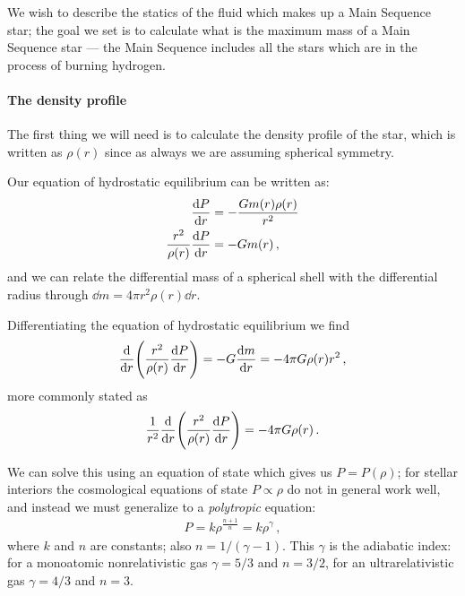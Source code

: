 \documentclass[main.tex]{subfiles}
\begin{document}
We wish to describe the statics of the fluid which makes up a Main Sequence star; the goal we set is to calculate what is the maximum mass of a Main Sequence star --- the Main Sequence includes all the stars which are in the process of burning hydrogen. 

\paragraph{The density profile}

The first thing we will need is to calculate the density profile of the star, which is written as \(\rho (r)\) since as always we are assuming spherical symmetry. 

Our equation of hydrostatic equilibrium can be written as:
%
\begin{align}
  \dv{P}{r} &= - \frac{G m(r) \rho (r)}{r^2}  \\
  \frac{r^2}{\rho (r)} \dv{P}{r} &= - G m(r)
\,,
\end{align}
%
and we can relate the differential mass of a spherical shell with the differential radius through \(\dd{m} = 4 \pi r^2 \rho (r) \dd{r}\).

Differentiating the equation of hydrostatic equilibrium we find
%
\begin{align}
  \dv{}{r} \qty(\frac{r^2}{\rho (r)} \dv{P}{r}) = - G \dv{m}{r} = - 4 \pi G \rho (r) r^2
\,,
\end{align}
%
more commonly stated as 
%
\begin{align}
  \frac{1}{r^2} \dv{}{r} \qty(\frac{r^2}{\rho (r)} \dv{P}{r}) = -4 \pi G \rho (r)
\,.
\end{align}
%


We can solve this using an equation of state which gives us \(P = P (\rho )\); for stellar interiors the cosmological equations of state \(P \propto \rho \) do not in general work well, and instead we must generalize to a \emph{polytropic} equation:
%
\begin{align}
  P = k \rho^{\frac{n+1}{n}} = k \rho^{\gamma }
\,,
\end{align}
%
where \(k\) and \(n\) are constants; also \(n = 1/ (\gamma -1)\).
This \(\gamma \) is the adiabatic index: for a monoatomic nonrelativistic gas \(\gamma = 5/3\) and \(n = 3/2\), for an ultrarelativistic gas \(\gamma = 4/3\) and \(n = 3\).
\end{document}
